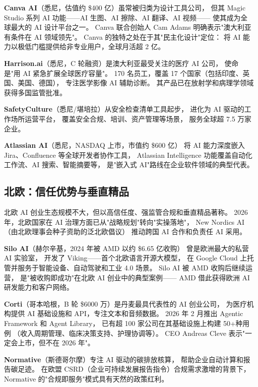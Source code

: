 \textbf{Canva AI}（悉尼，估值约 \$400 亿）虽常被归类为设计工具公司，
但其 Magic Studio 系列 AI 功能——AI 生图、AI 擦除、AI 翻译、AI 视频——
使其成为全球最大的 AI 设计平台之一。
Canva 联合创始人 Cam Adams 明确表示"澳大利亚有条件在 AI 领域领先"。
Canva 的独特之处在于其"民主化设计"定位：
将 AI 能力以极低门槛提供给非专业用户，全球月活超 2 亿。

\textbf{Harrison.ai}（悉尼，C 轮融资）是澳大利亚最受关注的医疗 AI 公司，
使命是"用 AI 紧急扩展全球医疗容量"。
170 名员工，覆盖 17 个国家（包括印度、英国、美国、德国），
专注医学影像 AI 辅助诊断。
其产品已在放射学和病理学领域获得多国监管批准。

\textbf{SafetyCulture}（悉尼/堪培拉）从安全检查清单工具起步，
进化为 AI 驱动的工作场所运营平台，
覆盖安全合规、培训、资产管理等场景，
服务全球超 7.5 万家企业。

\textbf{Atlassian AI}（悉尼，NASDAQ 上市，市值约 \$600 亿）
将 AI 能力深度嵌入 Jira、Confluence 等全球开发者协作工具，
Atlassian Intelligence 功能覆盖自动化工作流、AI 搜索、智能摘要等，
是"嵌入式 AI"路线在企业软件领域的典型代表。

\subsection{北欧：信任优势与垂直精品}

北欧 AI 创业生态规模不大，但以高信任度、强监管合规和垂直精品著称。
2026 年，北欧国家在 AI 治理方面已从"战略规划"转向"实操落地"，
New Nordics AI（由北欧理事会种子资助的泛北欧倡议）
推动跨国 AI 合作和负责任 AI 采用。

\textbf{Silo AI}（赫尔辛基，2024 年被 AMD 以约 \$6.65 亿收购）
曾是欧洲最大的私营 AI 实验室，
开发了 Viking——首个北欧语言开源大模型，
在 Google Cloud 上托管并服务于智能设备、自动驾驶和工业 4.0 场景。
Silo AI 被 AMD 收购后继续运营，
是"被收购即成功"在北欧 AI 创业中的典型案例——
AMD 借此获得欧洲 AI 研发能力和客户网络。

\textbf{Corti}（哥本哈根，B 轮 \$6000 万）是丹麦最具代表性的 AI 创业公司，
为医疗机构提供 AI 基础设施和 API，专注文本和音频数据。
2026 年 2 月推出 Agentic Framework 和 Agent Library，
已有超 100 家公司在其基础设施上构建 50+种用例
（收入周期管理、临床决策支持、护理协调等）。
CEO Andreas Cleve 表示"一定会上市，但不在 2026 年"。

\textbf{Normative}（斯德哥尔摩）专注 AI 驱动的碳排放核算，
帮助企业自动计算和报告碳足迹。
在欧盟 CSRD（企业可持续发展报告指令）合规需求激增的背景下，
Normative 的"合规即服务"模式具有天然的政策红利。

